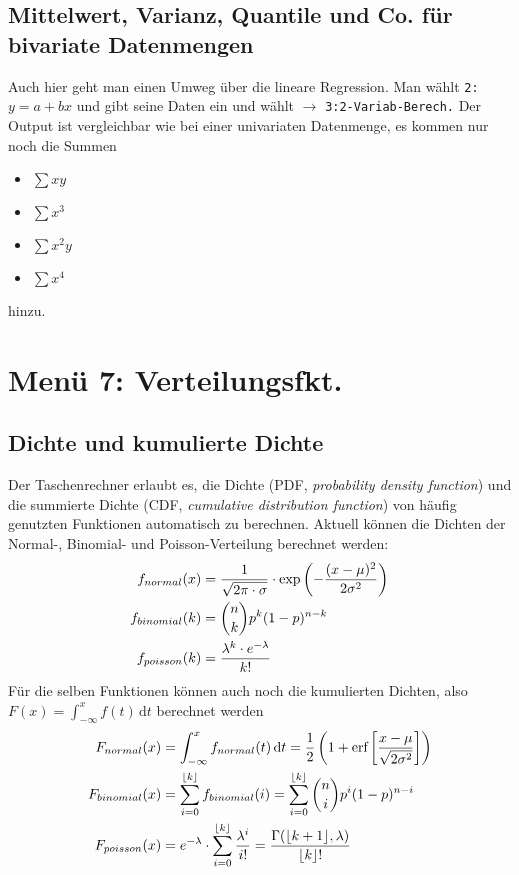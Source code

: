 \documentclass{article}
\newcommand{\taste}[1]{\fbox{\begin{varwidth}{\dimexpr\textwidth-2\fboxsep-2\fboxrule\relax}#1\end{varwidth}}}
\begin{document}
	\subsection*{Mittelwert, Varianz, Quantile und Co. für bivariate Datenmengen}
	
	Auch hier geht man einen Umweg über die lineare Regression. Man wählt \texttt{2:$y=a+bx$} und gibt seine Daten ein und wählt \taste{OPTN} $\to$ \texttt{3:2-Variab-Berech.} Der Output ist vergleichbar wie bei einer univariaten Datenmenge, es kommen nur noch die Summen
	\begin{itemize}
		\item $\sum xy$
		\item $\sum x^3$
		\item $\sum x^2y$
		\item $\sum x^4$
	\end{itemize}
	hinzu.
	
	\section*{Menü 7: Verteilungsfkt.}
	
	\subsection*{Dichte und kumulierte Dichte}
	
	Der Taschenrechner erlaubt es, die Dichte (PDF, \textit{probability density function}) und die summierte Dichte (CDF, \textit{cumulative distribution function}) von häufig genutzten Funktionen automatisch zu berechnen. Aktuell können die Dichten der Normal-, Binomial- und Poisson-Verteilung berechnet werden:
	\begin{align}
		f_{normal}(x) &= \frac{1}{\sqrt{2\pi\cdot\sigma}}\cdot\exp\left(-\frac{(x-\mu)^2}{2\sigma^2}\right) \notag \\
		f_{binomial}(k) &= \binom{n}{k}p^k(1-p)^{n-k} \notag \\
		f_{poisson}(k) &= \frac{\lambda^k\cdot e^{-\lambda}}{k!} \notag
	\end{align}
	Für die selben Funktionen können auch noch die kumulierten Dichten, also $F(x)=\int_{-\infty}^x f(t)\,\mathrm{d}t$ berechnet werden
	\begin{align}
		F_{normal}(x) &= \int_{-\infty}^x f_{normal}(t) \,\mathrm{d}t = \frac{1}{2}\left(1+\text{erf}\left[\frac{x-\mu}{\sqrt{2\sigma^2}}\right]\right) \notag \\
		F_{binomial}(x) &= \sum_{i=0}^{\lfloor k\rfloor} f_{binomial}(i) = \sum_{i=0}^{\lfloor k\rfloor} \binom{n}{i}p^i(1-p)^{n-i} \notag \\
		F_{poisson}(x) &= e^{-\lambda}\cdot\sum_{i=0}^{\lfloor k\rfloor} \frac{\lambda^i}{i!} = \frac{\Gamma(\lfloor k+1\rfloor,\lambda)}{\lfloor k\rfloor!} \notag
	\end{align}
	
\end{document}
